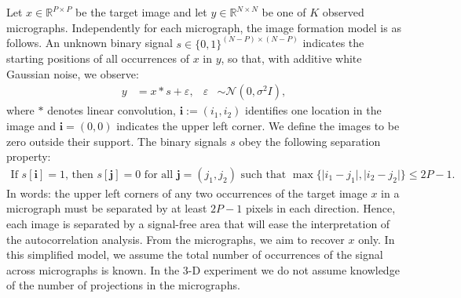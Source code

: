 \documentclass[english,11pt]{article}
\newcommand{\1}{\mathbf{1}}
\newcommand{\ii}{\textbf{i}}
\newcommand{\jj}{\textbf{j}}
\numberwithin{equation}{section}
\theoremstyle{plain}
\theoremstyle{definition}
\theoremstyle{remark}
\theoremstyle{plain}
\theoremstyle{remark}
\theoremstyle{plain}
\theoremstyle{plain}
\newcommand{\RNN}{\mathbb{R}^{N\times N}}
\newcommand{\RPP}{\mathbb{R}^{P\times P}}
\newcommand{\SNR}{\ensuremath{\textsf{SNR}}}
\begin{document}
Let $x\in\RPP$ be the target image and let $y\in\RNN$ be  one of  $K$ observed micrographs. 
Independently for each micrograph, the image formation model is as follows. An unknown binary signal $s\in\{0,1\}^{(N-P)\times(N-P)}$ indicates the starting positions of all occurrences of $x$ in $y$, so that, with additive white Gaussian noise, we observe:
\begin{align}
	y & =  x \ast s + \varepsilon, & \varepsilon & \sim \mathcal{N}(0,\sigma^2I),
	\label{eq:model}
\end{align}
where $\ast$ denotes linear convolution, $\ii:=(i_1,i_2)$ identifies one location in the image and $\ii=(0,0)$ indicates the  upper left corner.
We define the images to be zero outside their support.
The binary signals $s$ obey the following separation property: 
\begin{align}
	\textrm{If } s[\ii] = 1 \textrm{, then } s[\jj] = 0  \textrm{   for all $\jj=(j_1,j_2)$ such that   }  \max\{\vert i_1-j_1\vert, \vert i_2-j_2\vert\}\leq 2P-1.
	\label{eq:spacing}
\end{align}
In words: the upper left corners of any two occurrences of the target image $x$ in a micrograph must be separated by at least $2P-1$ pixels in each direction.
Hence, each image is separated by a signal-free area that will ease the interpretation of the autocorrelation analysis. 
From the micrographs, we aim to  recover $x$ only. In this simplified model, we assume  the total number of  occurrences of the signal across micrographs is known. 
In the 3-D experiment we do not assume knowledge of the number of projections in the micrographs.


%
%
\end{document}
